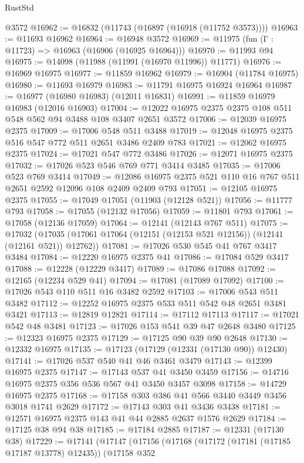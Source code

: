 \begin{lexlean}{RustStd}
\begin{coremodule}
    @3572
@16962 := @16832 (@11743 (@16897 (@16918 (@11752 @3573))))
@16963 := @11693 @16962
@16964 := @16948 @3572
@16969 := @11975 (fun (Γ : @11723) => @16963 (@16906 (@16925 @16964)))
@16970 := @11993 @94
@16975 := @14098 (@11988 (@11991 (@16970 @11996)) @11771)
@16976 := @16969 @16975
@16977 := @11859 @16962
@16979 := @16904 (@11784 @16975)
@16980 := @11693 @16979
@16983 := @11791 @16975 @16924 @16964
@16987 := @16977 (@16980 @16983) (@12011 @16831)
@16991 := @11859 @16979 @16983 (@12016 @16903)
@17004 := @12022 @16975 @2375 @2375 @108 @511 @548 @562 @94 @3488 @108 @3407 @2651 @3572
@17006 := @12039 @16975 @2375
@17009 := @17006 @548 @511 @3488
@17019 := @12048 @16975 @2375 @516 @547 @772 @511 @2651 @3486 @2409 @783
@17021 := @12062 @16975 @2375
@17024 := @17021 @547 @772 @3486
@17026 := @12071 @16975 @2375
@17032 := @17026 @523 @546 @769 @771 @3414 @3485
@17035 := @17006 @523 @769 @3414
@17049 := @12086 @16975 @2375 @521 @110 @16 @767 @511 @2651 @2592 @12096 @108 @2409 @2409 @793
@17051 := @12105 @16975 @2375
@17055 := @17049 @17051 (@11903 (@12128 @521))
@17056 := @11777 @793
@17058 := @17055 (@12132 @17056)
@17059 := @11801 @793
@17061 := @17058 (@12136 @17059)
@17064 := @12141 (@12143 @767 @511)
@17075 := @17032
    (@17035 (@17061 @17064 (@12151 (@12153 @521 @12156)) (@12141 (@12161 @521)) @12762))
@17081 := @17026 @530 @545 @41 @767 @3417 @3484
@17084 := @12220 @16975 @2375 @41
@17086 := @17084 @529 @3417
@17088 := @12228 (@12229 @3417)
@17089 := @17086 @17088
@17092 := @12165 (@12234 @529 @41)
@17094 := @17081 (@17089 @17092)
@17100 := @17026 @543 @110 @511 @16 @3482 @2592
@17103 := @17006 @543 @511 @3482
@17112 := @12252 @16975 @2375 @533 @511 @542 @48 @2651 @3481 @3421
@17113 := @12819 @12821
@17114 := @17112 @17113
@17117 := @17021 @542 @48 @3481
@17123 := @17026 @153 @541 @39 @47 @2648 @3480
@17125 := @12323 @16975 @2375
@17129 := @17125 @90 @39 @90 @2648
@17130 := @12332 @16975
@17135 := @17123 (@17129 (@12331 (@17130 @90)) @12430)
@17141 := @17026 @537 @540 @41 @46 @3461 @3479
@17143 := @12399 @16975 @2375
@17147 := @17143 @537 @41 @3450 @3459
@17156 := @14716 @16975 @2375 @356 @536 @567 @41 @3450 @3457 @3098
@17158 := @14729 @16975 @2375
@17168 := @17158 @303 @386 @41 @566 @3440 @3449 @3456 @3018 @1741 @2629
@17172 := @17143 @303 @41 @3436 @3438
@17181 := @12571 @16975 @2375 @143 @41 @44 @2885 @2637 @1576 @2629
@17184 := @17125 @38 @94 @38
@17185 := @17184 @2885
@17187 := @12331 (@17130 @38)
@17229 := @17141
    (@17147
      (@17156
        (@17168
          (@17172 (@17181 (@17185 @17187 @13778) @12435))
          (@17158
            @352

\end{coremodule}
\end{lexlean}
